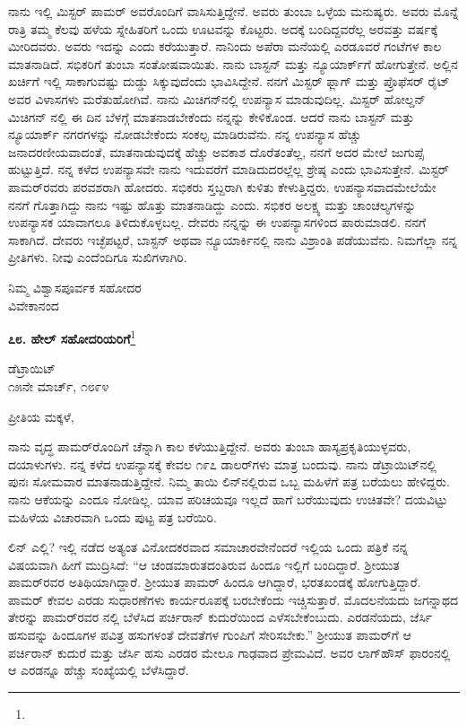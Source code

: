 ನಾನು ಇಲ್ಲಿ ಮಿಸ್ಟರ್ ಪಾಮರ್‌ ಅವರೊಂದಿಗೆ ವಾಸಿಸುತ್ತಿದ್ದೇನೆ. ಅವರು ತುಂಬಾ ಒಳ್ಳೆಯ ಮನುಷ್ಯರು. ಅವರು ಮೊನ್ನೆ ರಾತ್ರಿ ತಮ್ಮ ಕೆಲವು ಹಳೆಯ ಸ್ನೇಹಿತರಿಗೆ ಒಂದು ಊಟವನ್ನು ಕೊಟ್ಟರು. ಅದಕ್ಕೆ ಬಂದಿದ್ದವರೆಲ್ಲ ಅರವತ್ತು ವರ್ಷಕ್ಕೆ ಮೀರಿದವರು. ಅವರು ಇದನ್ನು  ಎಂದು ಕರೆಯುತ್ತಾರೆ. ನಾನಿಂದು ಅಪೆರಾ ಮನೆಯಲ್ಲಿ ಎರಡೂವರೆ ಗಂಟೆಗಳ ಕಾಲ ಮಾತನಾಡಿದೆ. ಸಭಿಕರಿಗೆ ತುಂಬಾ ಸಂತೋಷವಾಯಿತು. ನಾನು ಬಾಸ್ಟನ್ ಮತ್ತು ನ್ಯೂಯಾರ್ಕ್‌ಗೆ ಹೋಗುತ್ತೇನೆ. ಅಲ್ಲಿನ ಖರ್ಚಿಗೆ ಇಲ್ಲಿ ಸಾಕಾಗುವಷ್ಟು ದುಡ್ಡು ಸಿಕ್ಕುವುದೆಂದು ಭಾವಿಸಿದ್ದೇನೆ. ನನಗೆ ಮಿಸ್ಟರ್ ಫ್ಲಾಗ್ ಮತ್ತು ಪ್ರೊಫೆಸರ್ ರೈಟ್ ಅವರ ವಿಳಾಸಗಳು ಮರೆತುಹೋಗಿವೆ. ನಾನು ಮಿಚಿಗನ್‌ನಲ್ಲಿ ಉಪನ್ಯಾಸ ಮಾಡುವುದಿಲ್ಲ. ಮಿಸ್ಟರ್ ಹೋಲ್ಡನ್ ಮಿಚಿಗನ್ ನಲ್ಲಿ ಈ ದಿನ ಬೆಳಗ್ಗೆ ಮಾತನಾಡಬೇಕೆಂದು ನನ್ನನ್ನು ಕೇಳಿಕೊಂಡ. ಆದರೆ ನಾನು ಬಾಸ್ಟನ್ ಮತ್ತು ನ್ಯೂಯಾರ್ಕ್ ನಗರಗಳನ್ನು ನೋಡಬೇಕೆಂದು ಸಂಕಲ್ಪ ಮಾಡಿರುವೆನು. ನನ್ನ ಉಪನ್ಯಾಸ ಹೆಚ್ಚು ಜನಾದರಣೀಯವಾದಂತೆ, ಮಾತನಾಡುವುದಕ್ಕೆ ಹೆಚ್ಚು ಅವಕಾಶ ದೊರೆತಂತೆಲ್ಲ, ನನಗೆ ಅದರ ಮೇಲೆ ಜುಗುಪ್ಸೆ ಹುಟ್ಟುತ್ತಿದೆ. ನನ್ನ ಕಳೆದ ಉಪನ್ಯಾಸವೇ ನಾನು ಇದುವರೆಗೆ ಮಾಡಿದುದರಲ್ಲೆಲ್ಲ ಶ್ರೇಷ್ಠ ಎಂದು ಭಾವಿಸುತ್ತೇನೆ. ಮಿಸ್ಟರ್ ಪಾಮರ್‌ರವರು ಪರವಶರಾಗಿ ಹೋದರು. ಸಭಿಕರು ಸ್ತಬ್ದರಾಗಿ ಕುಳಿತು ಕೇಳುತ್ತಿದ್ದರು. ಉಪನ್ಯಾಸವಾದಮೇಲೆಯೇ ನನಗೆ ಗೊತ್ತಾಗಿದ್ದು ನಾನು ಇಷ್ಟು ಹೊತ್ತು ಮಾತನಾಡಿದ್ದು ಎಂದು. ಸಭಿಕರ ಅಲಕ್ಷ್ಯ ಮತ್ತು ಚಾಂಚಲ್ಯಗಳನ್ನು ಉಪನ್ಯಾಸಕ ಯಾವಾಗಲೂ ತಿಳಿದುಕೊಳ್ಳಬಲ್ಲ. ದೇವರು ನನ್ನನ್ನು ಈ ಉಪನ್ಯಾಸಗಳಿಂದ ಪಾರುಮಾಡಲಿ. ನನಗೆ ಸಾಕಾಗಿದೆ. ದೇವರು ಇಚ್ಛೆಪಟ್ಟರೆ, ಬಾಸ್ಟನ್ ಅಥವಾ ನ್ಯೂಯಾರ್ಕಿನಲ್ಲಿ ನಾನು ವಿಶ್ರಾಂತಿ ಪಡೆಯುವೆನು. ನಿಮಗೆಲ್ಲಾ ನನ್ನ ಪ್ರೀತಿಗಳು. ನೀವು ಎಂದೆಂದಿಗೂ ಸುಖಿಗಳಾಗಿರಿ.

{\flushright
ನಿಮ್ಮ ವಿಶ್ವಾಸಪೂರ್ವಕ ಸಹೋದರ\\ವಿವೇಕಾನಂದ\par}

\newpage

\begin{center}
\textbf{೭೮. ಹೇಲ್ ಸಹೋದರಿಯರಿಗೆ}\footnote{}
\end{center}

\begin{flushright}
ಡೆಟ್ರಾಯಿಟ್\\೧೫ನೇ ಮಾರ್ಚ್, ೧೮೯೪
\end{flushright}

\noindent
ಪ್ರೀತಿಯ ಮಕ್ಕಳೆ,

ನಾನು ವೃದ್ಧ ಪಾಮರ್‌ರೊಂದಿಗೆ ಚೆನ್ನಾಗಿ ಕಾಲ ಕಳೆಯುತ್ತಿದ್ದೇನೆ. ಅವರು ತುಂಬಾ ಹಾಸ್ಯಪ್ರಕೃತಿಯುಳ್ಳವರು, ದಯಾಳುಗಳು. ನನ್ನ ಕಳೆದ ಉಪನ್ಯಾಸಕ್ಕೆ ಕೇವಲ ೧೯೭ ಡಾಲರ್‌ಗಳು ಮಾತ್ರ ಬಂದುವು. ನಾನು ಡೆಟ್ರಾಯಿಟ್‌ನಲ್ಲಿ ಪುನಃ ಸೋಮವಾರ ಮಾತನಾಡುತ್ತಿದ್ದೇನೆ. ನಿಮ್ಮ ತಾಯಿ ಲಿನ್‌ನಲ್ಲಿರುವ ಒಬ್ಬ ಮಹಿಳೆಗೆ ಪತ್ರ ಬರೆಯಲು ಹೇಳಿದ್ದರು. ನಾನು ಆಕೆಯನ್ನು ಎಂದೂ ನೋಡಿಲ್ಲ. ಯಾವ ಪರಿಚಯವೂ ಇಲ್ಲದೆ ಹಾಗೆ ಬರೆಯುವುದು ಉಚಿತವೇ? ದಯವಿಟ್ಟು ಮಹಿಳೆಯ ವಿಚಾರವಾಗಿ ಒಂದು ಪುಟ್ಟ ಪತ್ರ ಬರೆಯಿರಿ.

ಲಿನ್ ಎಲ್ಲಿ? ಇಲ್ಲಿ ನಡೆದ ಅತ್ಯಂತ ವಿನೋದಕರವಾದ ಸಮಾಚಾರವೇನೆಂದರೆ ಇಲ್ಲಿಯ ಒಂದು ಪತ್ರಿಕೆ ನನ್ನ ವಿಷಯವಾಗಿ ಹೀಗೆ ಮುದ್ರಿಸಿದೆ: “ಆ ಚಂಡಮಾರುತದಂತಿರುವ ಹಿಂದೂ ಇಲ್ಲಿಗೆ ಬಂದಿದ್ದಾರೆ. ಶ‍್ರೀಯುತ ಪಾಮರ್‌ರವರ ಅತಿಥಿಯಾಗಿದ್ದಾರೆ. ಶ‍್ರೀಯುತ ಪಾಮರ್ ಹಿಂದೂ ಆಗಿದ್ದಾರೆ, ಭರತಖಂಡಕ್ಕೆ ಹೋಗುತ್ತಿದ್ದಾರೆ. ಪಾಮರ್‌ ಕೇವಲ ಎರಡು ಸುಧಾರಣೆಗಳು ಕಾರ್ಯರೂಪಕ್ಕೆ ಬರಬೇಕೆಂದು ಇಚ್ಚಿಸುತ್ತಾರೆ. ಮೊದಲನೆಯದು ಜಗನ್ನಾಥದ ತೇರನ್ನು ಪಾಮರ್‌ರವರ  ನಲ್ಲಿ ಬೆಳೆಸಿದ ಪರ್ಚಿರಾನ್  ಕುದುರೆಯಿಂದ ಎಳೆಸಬೇಕೆಂಬುದು. ಎರಡನೆಯದು, ಜೆರ್ಸಿ ಹಸುವನ್ನು ಹಿಂದೂಗಳ ಪವಿತ್ರ ಹಸುಗಳಂತೆ ದೇವತೆಗಳ ಗುಂಪಿಗೆ ಸೇರಿಸಬೇಕು.” ಶ‍್ರೀಯುತ ಪಾಮರ್‌ಗೆ ಆ ಪರ್ಚಿರಾನ್ ಕುದುರೆ ಮತ್ತು ಜೆರ್ಸಿ ಹಸು ಎರಡರ ಮೇಲೂ ಗಾಢವಾದ ಪ್ರೇಮವಿದೆ. ಅವರ ಲಾಗ್‌ಹೌಸ್ ಫಾರಂನಲ್ಲಿ ಆ ಎರಡನ್ನೂ ಹೆಚ್ಚು ಸಂಖ್ಯೆಯಲ್ಲಿ ಬೆಳೆಸಿದ್ದಾರೆ.

